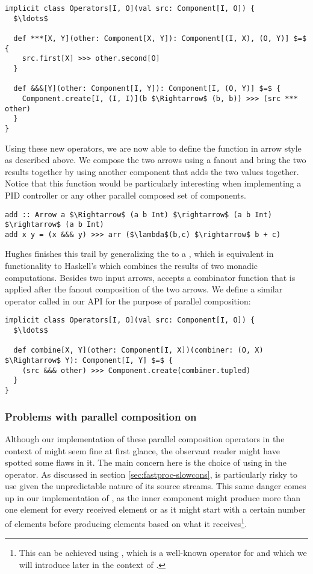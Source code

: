\begin{lstlisting}[style=InlineScalaStyle]
implicit class Operators[I, O](val src: Component[I, O]) {
  $\ldots$

  def ***[X, Y](other: Component[X, Y]): Component[(I, X), (O, Y)] $=$ {
    src.first[X] >>> other.second[O]
  }

  def &&&[Y](other: Component[I, Y]): Component[I, (O, Y)] $=$ {
    Component.create[I, (I, I)](b $\Rightarrow$ (b, b)) >>> (src *** other)
  }
}
\end{lstlisting}

Using these new operators, we are now able to define the  function in arrow style as described above. We compose the two arrows using a fanout and bring the two results together by using another component that adds the two values together. Notice that this function would be particularly interesting when implementing a PID controller or any other parallel composed set of components.

\begin{lstlisting}[style=InlineHaskellStyle]
add :: Arrow a $\Rightarrow$ (a b Int) $\rightarrow$ (a b Int) $\rightarrow$ (a b Int)
add x y = (x &&& y) >>> arr ($\lambda$(b,c) $\rightarrow$ b + c)
\end{lstlisting}

Hughes finishes this trail by generalizing the  to a , which is equivalent in functionality to Haskell's  which combines the results of two monadic computations. Besides two input arrows,  accepts a combinator function that is applied after the fanout composition of the two arrows. We define a similar operator called  in our API for the purpose of parallel composition:

\begin{lstlisting}[style=InlineScalaStyle]
implicit class Operators[I, O](val src: Component[I, O]) {
  $\ldots$

  def combine[X, Y](other: Component[I, X])(combiner: (O, X) $\Rightarrow$ Y): Component[I, Y] $=$ {
    (src &&& other) >>> Component.create(combiner.tupled)
  }
}
\end{lstlisting}

\subsubsection{Problems with parallel composition on \comp}
Although our implementation of these parallel composition operators in the context of \comp might seem fine at first glance, the observant reader might have spotted some flaws in it. The main concern here is the choice of using  in the  operator. As discussed in section \cref{sec:fastproc-slowcons},  is particularly risky to use given the unpredictable nature of its source streams. This same danger comes up in our implementation of , as the inner component might produce more than one element for every received element or as it might start with a certain number of elements before producing elements based on what it receives\footnote{This can be achieved using , which is a well-known operator for \obs and which we will introduce later in the context of \comp.}.

